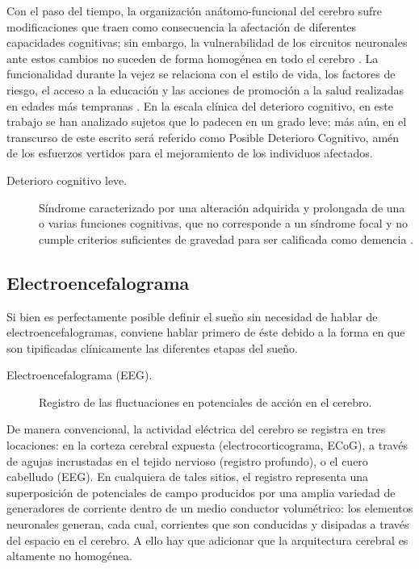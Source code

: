 \documentclass[12pt,a4paper]{mitthesis}
\begin{document}
Con el paso del tiempo, la organizaci\'on an\'atomo-funcional del cerebro sufre modificaciones que 
traen como consecuencia la afectaci\'on de diferentes capacidades cognitivas; sin embargo, la 
vulnerabilidad de los circuitos neuronales ante estos cambios no suceden de forma homog\'enea en 
todo el cerebro \cite{Hita14}.
La funcionalidad durante la vejez se relaciona con el estilo de vida, los factores de riesgo, el 
acceso a la educaci\'on y las acciones de promoci\'on a la salud realizadas en edades m\'as 
tempranas \cite{Ohayon04,Sanhueza14}.
En la escala cl\'inica del deterioro cognitivo, en este trabajo se han analizado sujetos que lo
padecen en un grado leve; m\'as a\'un, en el transcurso de este escrito ser\'a referido como 
Posible Deterioro Cognitivo, am\'en de los esfuerzos vertidos para el mejoramiento de los 
individuos afectados.

\begin{description}
\item[Deterioro cognitivo leve.] S\'indrome caracterizado por una alteraci\'on adquirida y 
prolongada de una o varias funciones cognitivas, que no corresponde a un s\'indrome focal y no 
cumple criterios suficientes de gravedad para ser calificada como demencia \cite{Robles02}.
\end{description}


\subsection{Electroencefalograma}

Si bien es perfectamente posible definir el sue\~no sin necesidad de hablar de 
electroencefalogramas, conviene hablar primero de \'este debido a la forma en que son tipificadas
cl\'inicamente las diferentes etapas del sue\~no.

\begin{description}
\item[Electroencefalograma (EEG).] Registro de las fluctuaciones en potenciales de acci\'on en el cerebro.
\end{description}

De manera convencional, la actividad el\'ectrica del cerebro se registra en tres locaciones: en la 
corteza cerebral expuesta (electrocorticograma, ECoG), a trav\'es de agujas incrustadas en el 
tejido nervioso (registro profundo), o el cuero cabelludo (EEG).
En cualquiera de tales sitios, el registro representa una superposici\'on de potenciales de campo 
producidos por una amplia variedad de generadores de corriente dentro de un medio conductor 
volum\'etrico: los elementos neuronales generan, cada cual, corrientes que son conducidas y 
disipadas a trav\'es del espacio en el cerebro.
A ello hay que adicionar que la arquitectura cerebral es altamente no homog\'enea.
\end{document}
